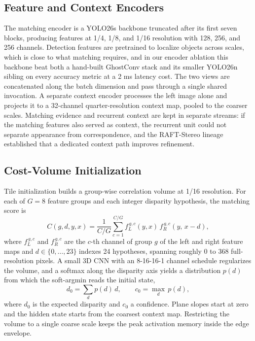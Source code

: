 \documentclass[conference]{IEEEtran}
\begin{document}
\subsection{Feature and Context Encoders}
The matching encoder is a YOLO26s backbone truncated after its first seven blocks, producing features at 1/4, 1/8, and 1/16 resolution with 128, 256, and 256 channels. Detection features are pretrained to localize objects across scales, which is close to what matching requires, and in our encoder ablation this backbone beat both a hand-built GhostConv stack and its smaller YOLO26n sibling on every accuracy metric at a 2 ms latency cost. The two views are concatenated along the batch dimension and pass through a single shared invocation. A separate context encoder processes the left image alone and projects it to a 32-channel quarter-resolution context map, pooled to the coarser scales. Matching evidence and recurrent context are kept in separate streams: if the matching features also served as context, the recurrent unit could not separate appearance from correspondence, and the RAFT-Stereo lineage \cite{lipson2021raftstereo} established that a dedicated context path improves refinement.

\subsection{Cost-Volume Initialization}
Tile initialization builds a group-wise correlation volume \cite{guo2019gwcnet} at 1/16 resolution. For each of $G=8$ feature groups and each integer disparity hypothesis, the matching score is
\begin{equation}
C(g,d,y,x) = \frac{1}{C/G}\sum_{c=1}^{C/G}
  f_{L}^{\,g,c}(y,x)\, f_{R}^{\,g,c}(y,\,x-d),
\label{eq:gwc}
\end{equation}
where $f_{L}^{\,g,c}$ and $f_{R}^{\,g,c}$ are the $c$-th channel of group $g$ of the left and right feature maps and $d \in \{0,\dots,23\}$ indexes 24 hypotheses, spanning roughly 0 to 368 full-resolution pixels. A small 3D CNN with an 8-16-16-1 channel schedule regularizes the volume, and a softmax along the disparity axis yields a distribution $p(d)$ from which the soft-argmin \cite{kendall2017gcnet} reads the initial state,
\begin{equation}
d_{0} = \sum_{d} p(d)\, d, \qquad
c_{0} = \max_{d}\, p(d),
\label{eq:init}
\end{equation}
where $d_0$ is the expected disparity and $c_0$ a confidence. Plane slopes start at zero and the hidden state starts from the coarsest context map. Restricting the volume to a single coarse scale keeps the peak activation memory inside the edge envelope.
\end{document}
